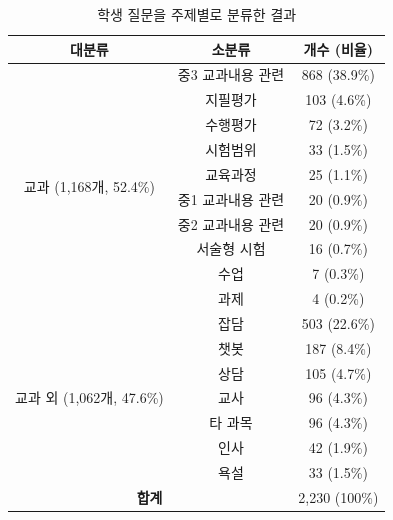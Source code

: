 \begin{table}[h!]
    \centering
    \caption{학생 질문을 주제별로 분류한 결과\citep{min2022}}
    \label{doc2vec-table1}
    \begin{tabular}{ccc}
    \hline
    {\textbf{대분류}} & {\textbf{소분류}} & \textbf{개수 (비율)} \\ \hline
    \multirow{10}{*}{교과 (1,168개, 52.4\%)} & 중3 교과내용 관련 & 868 (38.9\%) \\ \cline{2-3} 
     & 지필평가 & 103 (4.6\%) \\ \cline{2-3} 
     & 수행평가 & 72 (3.2\%) \\ \cline{2-3} 
     & 시험범위 & 33 (1.5\%) \\ \cline{2-3} 
     & 교육과정 & 25 (1.1\%) \\ \cline{2-3} 
     & 중1 교과내용 관련 & 20 (0.9\%) \\ \cline{2-3} 
     & 중2 교과내용 관련 & 20 (0.9\%) \\ \cline{2-3} 
     & 서술형 시험 & 16 (0.7\%) \\ \cline{2-3} 
     & 수업 & 7 (0.3\%) \\ \cline{2-3} 
     & 과제 & 4 (0.2\%) \\ \hline
    \multirow{7}{*}{교과 외 (1,062개, 47.6\%)} & 잡담 & 503 (22.6\%) \\ \cline{2-3} 
     & 챗봇 & 187 (8.4\%) \\ \cline{2-3} 
     & 상담 & 105 (4.7\%) \\ \cline{2-3} 
     & 교사 & 96 (4.3\%) \\ \cline{2-3} 
     & 타 과목 & 96 (4.3\%) \\ \cline{2-3} 
     & 인사 & 42 (1.9\%) \\ \cline{2-3} 
     & 욕설 & 33 (1.5\%) \\ \hline
    \multicolumn{2}{c}{\textbf{합계}} & 2,230 (100\%) \\ \hline
    \end{tabular}
\end{table}